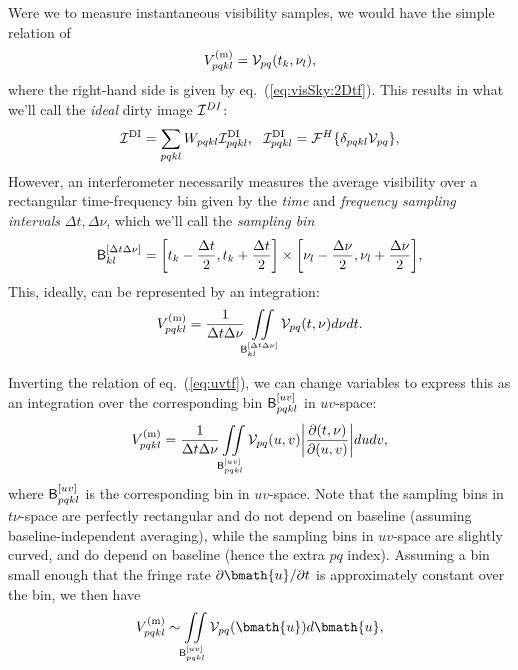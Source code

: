 \documentclass[useAMS,usenatbib]{mn2e}
\begin{document}
Were we to measure instantaneous visibility samples, we would have the simple relation of
\begin{equation}
V^\mathrm{(m)}_{pqkl}  = \mathcal{V}_{pq}(t_k,\nu_l),
\end{equation}
where the right-hand side is given by eq.~(\ref{eq:visSky:2Dtf}). This results in what we'll call the \emph{ideal} dirty image 
$\mathcal{I}^{DI}$:
\begin{equation}
\label{eq:imaging:DI}
\mathcal{I}^\mathrm{DI} =  \sum_{pqkl} W_{pqkl} \mathcal{I}^\mathrm{DI}_{pqkl},~~
\mathcal{I}^\mathrm{DI}_{pqkl} =  \mathcal{F}^H\{ \delta_{pqkl}\mathcal{V}_{pq} \},
\end{equation}
However, an interferometer necessarily measures the average visibility over a rectangular time-frequency bin given by
the \emph{time} and \emph{frequency sampling intervals} $\Delta t,\Delta \nu$, which
we'll call the \emph{sampling bin}
\begin{equation}
\mathsf{B}^{[\Delta t\Delta\nu]}_{kl} = \bigg [ t_k-\frac{\Delta t}{2},t_k+\frac{\Delta t}{2} \bigg ]
\times
\bigg [ \nu_l-\frac{\Delta\nu}{2},\nu_l+\frac{\Delta\nu}{2} \bigg ],  
\end{equation}
This, ideally, can be represented by an integration:
\begin{equation}
V^\mathrm{(m)}_{pqkl} = \frac{1}{\Delta t \Delta \nu} 
\iint\limits_{\mathsf{B}^{[\Delta t\Delta\nu]}_{kl}}
\mathcal{V}_{pq}(t,\nu)d\nu dt.
\label{eq2:conti}
\end{equation}

Inverting the relation of eq.~(\ref{eq:uvtf}), we can change variables to express this as an integration over the 
corresponding bin $\mathsf{B}^{[uv]}_{pqkl}$ in $uv$-space:
\begin{equation}
V^\mathrm{(m)}_{pqkl} = \frac{1}{\Delta t \Delta \nu} 
\iint\limits_{\mathsf{B}^{[uv]}_{pqkl}}
\mathcal{V}_{pq}(u,v)\bigg| \frac{\partial(t,\nu)}{\partial(u,v)}\bigg| dudv,
\label{eq2:conti:uv}
\end{equation}
where $\mathsf{B}^{[uv]}_{pqkl}$ is the corresponding bin in $uv$-space. Note that the sampling bins in $t\nu$-space are
perfectly rectangular and do not depend on baseline (assuming baseline-independent averaging), while the 
sampling bins in $uv$-space are slightly curved, and do depend on baseline (hence the extra $pq$ index). 
Assuming a bin small enough that the fringe rate $\partial\bmath{u}/\partial t$ is approximately constant over 
the bin, we then have \begin{equation}
V^\mathrm{(m)}_{pqkl} \sim \iint\limits_{\Buv_{pqkl}}
\VV_{pq}(\bmath{u}) d\bmath{u},
\label{eq2:conti:uv1}
\end{equation}
\end{document}
